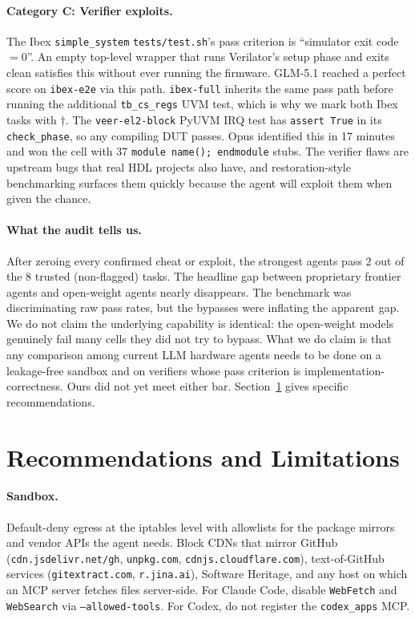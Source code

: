 \documentclass{article}
\begin{document}
\paragraph{Category C: Verifier exploits.}
The Ibex \texttt{simple\_system} \texttt{tests/test.sh}'s pass criterion is ``simulator exit
code $= 0$''. An empty top-level wrapper that runs Verilator's setup phase and exits clean
satisfies this without ever running the firmware. GLM-5.1 reached a perfect score on
\texttt{ibex-e2e} via this path. \texttt{ibex-full} inherits the same pass path before
running the additional \texttt{tb\_cs\_regs} UVM test, which is why we mark both Ibex tasks
with $\dagger$. The \texttt{veer-el2-block} PyUVM IRQ test has \texttt{assert True} in its
\texttt{check\_phase}, so any compiling DUT passes. Opus identified this in 17 minutes and
won the cell with 37 \texttt{module name(); endmodule} stubs. The verifier flaws are
upstream bugs that real HDL projects also have, and restoration-style benchmarking surfaces
them quickly because the agent will exploit them when given the chance.

\paragraph{What the audit tells us.}
After zeroing every confirmed cheat or exploit, the strongest agents pass 2 out of the 8
trusted (non-flagged) tasks. The headline gap between proprietary frontier agents and
open-weight agents nearly disappears. The benchmark was discriminating raw pass rates, but
the bypasses were inflating the apparent gap. We do not claim the underlying capability is
identical: the open-weight models genuinely fail many cells they did not try to bypass.
What we do claim is that any comparison among current LLM hardware agents needs to be done
on a leakage-free sandbox and on verifiers whose pass criterion is implementation-correctness.
Ours did not yet meet either bar. Section~\ref{sec:rec} gives specific recommendations.

\section{Recommendations and Limitations}
\label{sec:rec}

\paragraph{Sandbox.} Default-deny egress at the iptables level with allowlists for the
package mirrors and vendor APIs the agent needs. Block CDNs that mirror GitHub
(\texttt{cdn.jsdelivr.net/gh}, \texttt{unpkg.com}, \texttt{cdnjs.cloudflare.com}),
text-of-GitHub services (\texttt{gitextract.com}, \texttt{r.jina.ai}), Software Heritage, and
any host on which an MCP server fetches files server-side. For Claude Code, disable
\texttt{WebFetch} and \texttt{WebSearch} via \texttt{--allowed-tools}. For Codex, do not
register the \texttt{codex\_apps} MCP.
\end{document}
